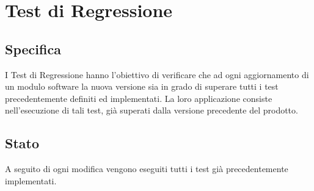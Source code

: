 \section{Test di Regressione}

	\subsection{Specifica}
		I Test di Regressione hanno l'obiettivo di verificare che ad ogni aggiornamento di un modulo software la nuova versione sia in grado di superare tutti i test precedentemente definiti ed implementati.
		La loro applicazione consiste nell'esecuzione di tali test, già superati dalla versione precedente del prodotto.\\
	
	
	\subsection{Stato}
		A seguito di ogni modifica vengono eseguiti tutti i test già precedentemente implementati.